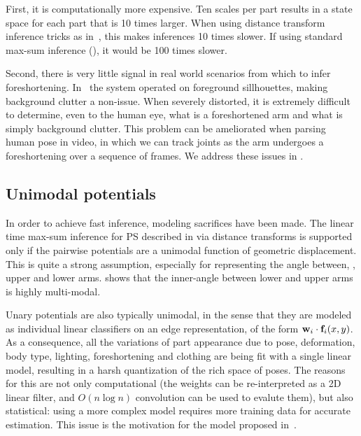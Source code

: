  First, it is computationally more expensive.  Ten scales per part results in a 
state space for each part that is 10 times larger.  When using distance 
transform inference tricks as in~, this makes inferences 10 times 
slower.  If using standard max-sum inference (), it would 
be 100 times slower.   

Second, there is very little signal in real world scenarios from which to infer 
foreshortening.  In~\citet{felz05} the system operated on foreground 
sillhouettes, making background clutter a non-issue.  When severely distorted, 
it is extremely difficult to determine, even to the human eye, what is a 
foreshortened arm and what is simply background clutter. This problem can be 
ameliorated when parsing human pose in video, in which we can track joints as 
the arm undergoes a foreshortening over a sequence of frames.  We address these 
issues in .

\subsection{Unimodal potentials}

In order to achieve fast inference, modeling sacrifices have been made.  The 
linear time max-sum inference for PS described in  via distance 
transforms is supported only if the pairwise potentials are a unimodal function 
of geometric displacement.  This is quite a strong assumption, especially for 
representing the angle between, \eg, upper and lower arms.  
 shows that the inner-angle between lower and 
upper arms is highly multi-modal.

Unary potentials are also typically unimodal, in the sense that they are 
modeled as individual linear classifiers on an edge representation, of the form 
$\mathbf{w}_i \cdot \mathbf{f}_i(x,y)$.  As a consequence, all the variations of part 
appearance due to pose, deformation, body type, lighting, foreshortening and 
clothing are being fit with a single linear model, resulting in a harsh 
quantization of the rich space of poses.  The reasons for this are not only 
computational (the weights can be re-interpreted as a 2D linear filter, and 
$O(n \log n)$ convolution can be used to evalute them), but also statistical: 
using a more complex model requires more training data for accurate estimation.  
This issue is the motivation for the model proposed in~.

